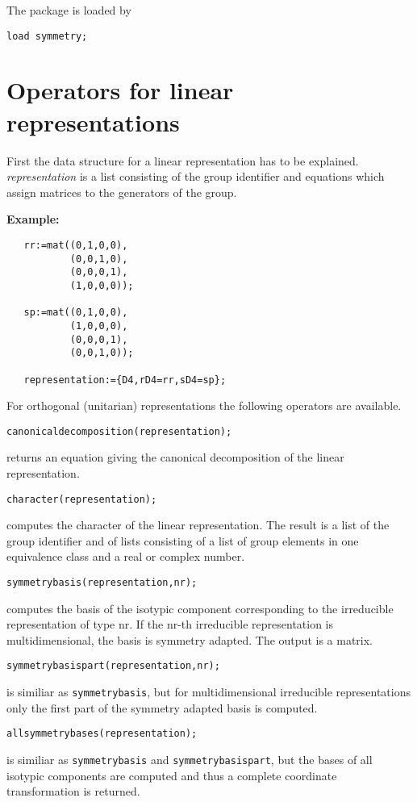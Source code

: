 The package is loaded by

{\tt load symmetry;}

\section{Operators for linear representations}

First the data structure for a linear representation has to be explained.
{\em representation} is a list consisting of the group identifier and
equations which assign matrices to the generators of the group.

{\bf Example:}
\begin{verbatim}
   rr:=mat((0,1,0,0),
           (0,0,1,0),
           (0,0,0,1),
           (1,0,0,0));

   sp:=mat((0,1,0,0),
           (1,0,0,0),
           (0,0,0,1),
           (0,0,1,0));

   representation:={D4,rD4=rr,sD4=sp};
\end{verbatim}

For orthogonal (unitarian) representations the following operators
are available.

{\tt canonicaldecomposition(representation);} 

returns an equation giving the canonical decomposition of the linear representation.

{\tt character(representation);}

computes the character of the linear representation. The result is a list
of the group identifier and of lists consisting of a 
list of group elements in one equivalence class and a real or complex number.

{\tt symmetrybasis(representation,nr);}

computes the basis of the isotypic component corresponding to the irreducible
representation of type nr. If the nr-th irreducible representation is
multidimensional, the basis is symmetry adapted. The output is a matrix.
 
{\tt symmetrybasispart(representation,nr);}

is similiar as {\tt symmetrybasis}, but for multidimensional 
irreducible representations only the first part of the 
symmetry adapted basis is computed.

{\tt allsymmetrybases(representation);}

is similiar as {\tt symmetrybasis} and {\tt symmetrybasispart}, 
but the bases of all
isotypic components are computed and thus a 
complete coordinate transformation is returned.

